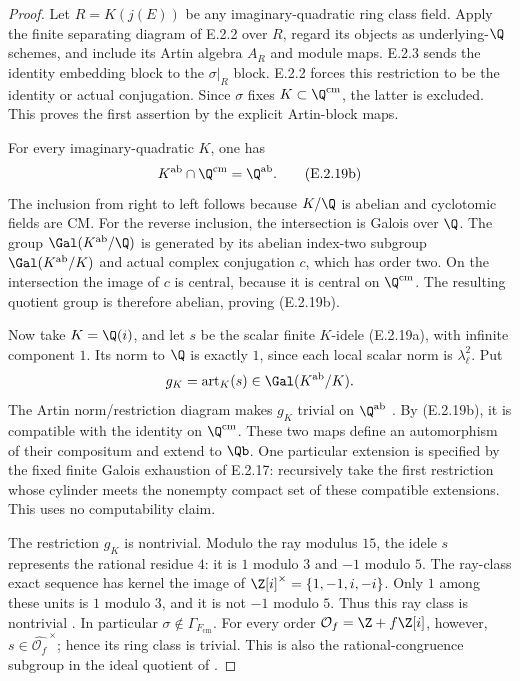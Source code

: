 \begin{proof}
Let \(R=K(j(E))\) be any imaginary-quadratic ring class field.
Apply the finite separating diagram of E.2.2 over \(R\), regard
its objects as underlying-\(\Q\) schemes, and include its
Artin algebra \(A_R\) and module maps. E.2.3 sends the identity
embedding block to the \(\sigma|_R\) block. E.2.2 forces this
restriction to be the identity or actual conjugation. Since
\(\sigma\) fixes \(K\subset\Q^{\mathrm{cm}}\), the latter is
excluded. This proves the first assertion by the explicit
Artin-block maps.

For every imaginary-quadratic \(K\), one has
\[
 K^{\mathrm{ab}}\cap\Q^{\mathrm{cm}}=\Q^{\mathrm{ab}}.
 \tag{E.2.19b}
\]
The inclusion from right to left follows because \(K/\Q\)
is abelian and cyclotomic fields are CM. For the reverse
inclusion, the intersection is Galois over \(\Q\).
The group \(\Gal(K^{\mathrm{ab}}/\Q)\) is generated by its
abelian index-two subgroup \(\Gal(K^{\mathrm{ab}}/K)\) and
actual complex conjugation \(c\), which has order two.
On the intersection the image of \(c\) is central, because
it is central on \(\Q^{\mathrm{cm}}\). The resulting quotient
group is therefore abelian, proving (E.2.19b).

Now take \(K=\Q(i)\), and let \(s\) be the scalar finite
\(K\)-idele (E.2.19a), with infinite component \(1\).
Its norm to \(\Q\) is exactly \(1\), since each local
scalar norm is \(\lambda_\ell^2\). Put
\[
 g_K=\operatorname{art}_K(s)\in\Gal(K^{\mathrm{ab}}/K).
\]
The Artin norm/restriction diagram makes \(g_K\) trivial
on \(\Q^{\mathrm{ab}}\)
\cite[Chapter V, Proposition 5.2 and its following diagram,
pp.~178--179]{GenMilneCFT2020}.
By (E.2.19b), it is compatible with the identity on
\(\Q^{\mathrm{cm}}\). These two maps define an automorphism
of their compositum and extend to \(\Qb\).
One particular extension is specified by the fixed finite
Galois exhaustion of E.2.17: recursively take the first
restriction whose cylinder meets the nonempty compact set
of these compatible extensions. This uses no computability
claim.

The restriction \(g_K\) is nontrivial. Modulo the ray
modulus \(15\), the idele \(s\) represents the rational
residue \(4\): it is \(1\) modulo \(3\) and \(-1\) modulo
\(5\). The ray-class exact sequence has kernel the image
of \(\Z[i]^\times=\{1,-1,i,-i\}\). Only \(1\) among these
units is \(1\) modulo \(3\), and it is not \(-1\) modulo
\(5\). Thus this ray class is nontrivial
\cite[Chapter V, Theorem 1.7 and proof,
pp.~150--151]{GenMilneCFT2020}.
In particular \(\sigma\notin\Gamma_{F_{\mathrm{cm}}}\).
For every order \(\mathcal O_f=\Z+f\Z[i]\), however,
\(s\in\widehat{\mathcal O_f}^{\,\times}\); hence its ring
class is trivial. This is also the rational-congruence
subgroup in the ideal quotient of
\cite[Theorem 9.18, pp.~190--192]{GenCox1989}.


\end{proof}
